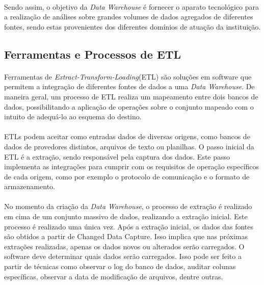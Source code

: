\paragraph{} Sendo assim, o objetivo da \textit{Data Warehouse} é fornecer o aparato tecnológico para a realização de análises sobre grandes volumes de dados agregados de diferentes fontes, sendo estas provenientes dos diferentes domínios de atuação da instituição.

\subsection{Ferramentas e Processos de ETL}

\paragraph{} Ferramentas de \textit{Extract-Transform-Loading}(ETL) são soluções em software que permitem a integração de diferentes fontes de dados a uma \textit{Data Warehouse}.
De maneira geral, um processo de ETL realiza um mapeamento entre dois bancos de dados, possibilitando a aplicação de operações sobre o conjunto mapeado com o intuito de adequá-lo ao esquema do destino.

\paragraph{} ETLs podem aceitar como entradas dados de diversas origens, como bancos de dados de provedores distintos, arquivos de texto ou planilhas. O passo inicial da ETL é a extração, sendo responsável pela captura dos dados. Este passo implementa as integrações para cumprir com os requisitos de operação específicos de cada origem, como por exemplo o protocolo de comunicação e o formato de armazenamento.

\paragraph{} No momento da criação da \textit{Data Warehouse}, o processo de extração é realizado em cima de um conjunto massivo de dados, realizando a extração inicial. Este processo é realizado uma única vez. \cite{kimball2008data} Após a extração inicial, os dados das fontes são obtidos a partir de Changed Data Capture. Isso implica que nas próximas extrações realizadas, apenas os dados novos ou alterados serão carregados. O software deve determinar quais dados serão carregados. Isso pode ser feito a partir de técnicas como observar o log do banco de dados, auditar colunas específicas, observar a data de modificação de arquivos, dentre outras.

